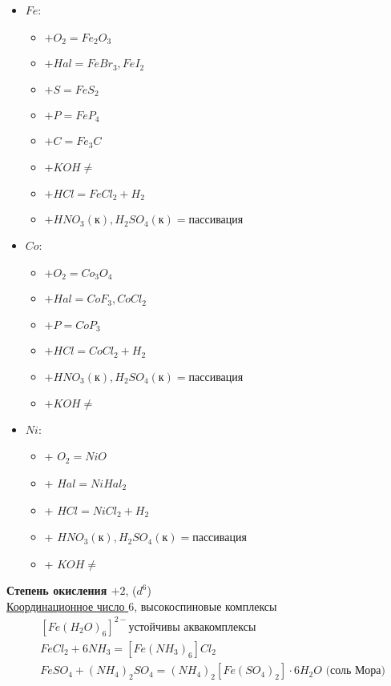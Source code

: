 \begin{itemize}
	\item $Fe$:
	\begin{itemize}
		\item $+ O_2 = Fe_2O_3$
		\item $+ Hal = FeBr_3, FeI_2$
		\item $+ S = FeS_2$
		\item $+ P = FeP_4$
		\item $+ C = Fe_3C$
		\item $+ KOH \not =$
		\item $+ HCl = FeCl_2 + H_2$
		\item $+ HNO_3(\text{к}), H_2SO_4 (\text{к}) = \text{пассивация}$		
	\end{itemize}
	\item $Co$:
	\begin{itemize}
		\item $+ O_2 = Co_3O_4$
		\item $+ Hal = CoF_3, CoCl_2$
		\item $+ P = CoP_3$
		\item $+ HCl = CoCl_2 + H_2$
		\item $+ HNO_3(\text{к}), H_2SO_4 (\text{к}) = \text{пассивация}$
		\item $+ KOH \not =$
	\end{itemize}	
	\item $Ni$:
	\begin{itemize}
		\item + $O_2 = NiO$
		\item + $Hal = NiHal_2$
		\item + $HCl = NiCl_2 + H_2$
		\item + $HNO_3(\text{к}), H_2SO_4 (\text{к}) = \text{пассивация}$
		\item + $KOH \not =$
	\end{itemize}
\end{itemize}
\begin{figure} [H]
	\centering {\texttt{[image: ww1]}}
\end{figure}
\textbf{Степень окисления $+2$}, ($d^6$)\\
\ul{Координационное число $6$}, высокоспиновые комплексы
\begin{align*}
&\left[Fe(H_2O)_6 \right]^{2-} \text{устойчивы аквакомплексы} \\
&FeCl_2 + 6 NH_3 = \left[Fe(NH_3)_6 \right]Cl_2 \\
&FeSO_4 + (NH_4)_2SO_4 = (NH_4)_2\left[Fe(SO_4)_2 \right] \cdot 6 H_2O \text{ (соль Мора)}
\end{align*}
